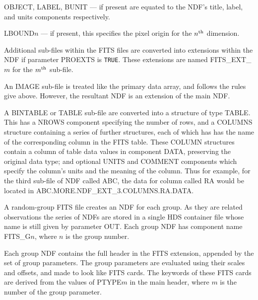 {{{{            \sstitem
            OBJECT, LABEL, BUNIT --- if present are equated to the NDF's
            title, label, and units components respectively.

            \sstitem
            LBOUND$n$ --- if present, this specifies the pixel origin for
            the $n^{\rm th}$ dimension.
         }

         \sstitem
         Additional sub-files within the FITS files are converted into
         extensions within the NDF if parameter PROEXTS is {\tt TRUE}.  These
         extensions are named FITS\_EXT\_$m$ for the $m^{\rm th}$ sub-file.

         \sstitem
         An IMAGE sub-file is treated like the primary data array, and
         follows the rules give above.  However, the resultant NDF is an
         extension of the main NDF.

         \sstitem
         A BINTABLE or TABLE sub-file are converted into a structure
         of type TABLE.  This has a NROWS component specifying the
         number of rows, and a COLUMNS structure containing a series of
         further structures, each of which has has the name of the
         corresponding column in the FITS table.  These COLUMN structures
         contain a column of table data values in component DATA,
         preserving the original data type; and optional UNITS and COMMENT
         components which specify the column's units and the meaning of
         the column.  Thus for example, for the third sub-file of NDF
         called ABC, the data for column called RA would be located in
         ABC.MORE.NDF\_EXT\_3.COLUMNS.RA.DATA.

         \sstitem
         A random-group FITS file creates an NDF for each group.  As
         they are related observations the series of NDFs are stored in a
         single HDS container file whose name is still given by parameter
         OUT.  Each group NDF has component name FITS\_G$n$, where $n$ is the
         group number.

         Each group NDF contains the full header in the FITS extension,
         appended by the set of group parameters.  The group parameters
         are evaluated using their scales and offsets, and made to look
         like FITS cards.  The keywords of these FITS cards are derived
         from the values of PTYPE$m$ in the main header, where $m$ is the
         number of the group parameter.
      }
   }
   }
